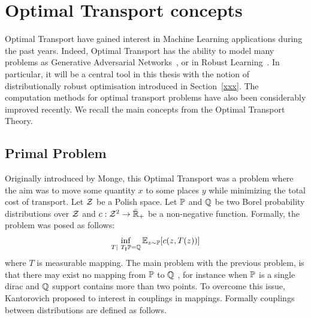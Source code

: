 \section{Optimal Transport concepts}
Optimal Transport have gained interest in Machine Learning applications during the past years. Indeed, Optimal Transport has the ability to model many problems as Generative Adversarial Networks~\citep{arjovsky2017wasserstein}, or in Robust Learning~\citep{sinha2017certifying,pydi2019adversarial,xxx}. In particular, it will be a central tool in this thesis with the notion of distributionally robust optimisation introduced in Section~\ref{xxx}. The computation methods for optimal transport problems have also been considerably improved recently.  We recall the main concepts from the Optimal Transport Theory. 

\subsection{Primal Problem}
Originally introduced by Monge, this Optimal Transport was a problem where the aim was to move some quantity $x$ to some places $y$ while minimizing the total cost of transport.  Let $\mathcal{Z}$ be a Polish space. Let $\mathbb{P}$ and $\mathbb{Q}$ be two Borel probability distributions over $\mathcal{Z}$ and $c:\mathcal{Z}^2\to\bar{\mathbb{R}}_+$ be a non-negative function. Formally, the problem was posed as follows:
\begin{align*}
    \inf_{T\mid~T_\sharp\PP = \QQ}\mathbb{E}_{z\sim\PP}\left[c(z,T(z))\right]
\end{align*}
where $T$ is measurable mapping. The main problem with the previous problem, is that there may exist no mapping from $\mathbb{P}$ to $\mathbb{Q}$ , for instance when $\mathbb{P}$ is a single dirac and $\mathbb{Q}$ support contains more than two points. To overcome this issue, Kantorovich proposed to interest in couplings in mappings. Formally couplings between distributions are defined as follows.



